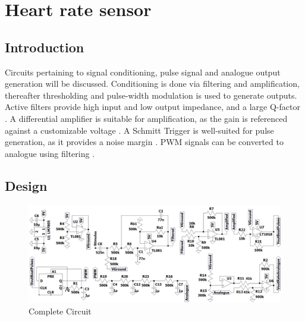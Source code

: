 \chapter{Heart rate sensor}\label{ch:heartRate}

\section{Introduction} \label{sec:heartIntro}
Circuits pertaining to signal conditioning, pulse signal and analogue output generation will be discussed. Conditioning is done via filtering and amplification, thereafter thresholding and pulse-width modulation is used to generate outputs. Active filters provide high input and low output impedance, and a large Q-factor \cite{actpas}. A differential amplifier is suitable for amplification, as the gain is referenced against a customizable voltage \cite{opamp}. A Schmitt Trigger is well-suited for pulse generation, as it provides a noise margin \cite{schmitt}. PWM signals can be converted to analogue using filtering \cite{PWM}.

\section{Design} \label{sec:heartDesign}
\begin{figure}[h]
    \centering
    \vspace{-1cm}
    \includegraphics[width = 1\textwidth]{Figures/circuit}
    \caption{Complete Circuit}
    \label{fig:circuit}
\end{figure}

